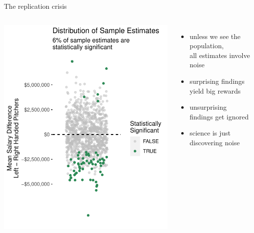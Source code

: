 \documentclass{beamer}
\begin{document}
\begin{frame}{The replication crisis}

\begin{columns}

\includegraphics[width = \textwidth]{pitchers_sample_scatter}

\begin{itemize} \pause
\item unless we see the population,\\all estimates involve noise \pause
\item surprising findings yield big rewards \pause
\item unsurprising findings get ignored \pause
\item science is just discovering noise
\end{itemize}

\end{columns}

\end{frame}
\end{document}
